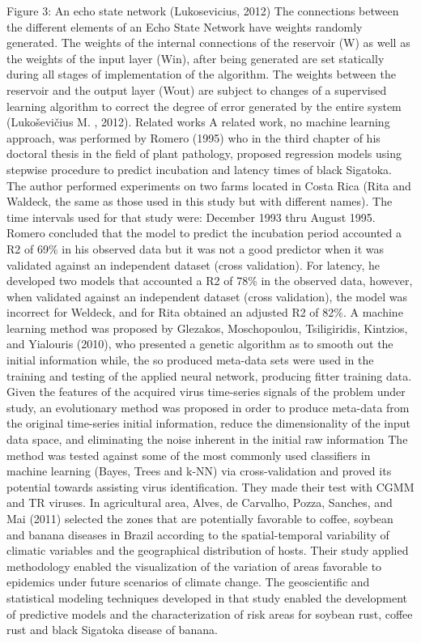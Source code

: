 \documentclass[review]{elsarticle}
\begin{document}
{{Figure 3: An echo state network (Lukosevicius, 2012)
The connections between the different elements of an Echo State Network have weights randomly generated. The weights of the internal connections of the reservoir (W) as well as the weights of the input layer (Win), after being generated are set statically during all stages of implementation of the algorithm. The weights between the reservoir and the output layer (Wout) are subject to changes of a supervised learning algorithm to correct the degree of error generated by the entire system (Lukoševičius M. , 2012).
Related works
A related work, no machine learning approach, was performed by Romero (1995) who in the third chapter of his doctoral thesis in the field of plant pathology, proposed regression models using stepwise procedure to predict incubation and latency times of black Sigatoka. The author performed experiments on two farms located in Costa Rica (Rita and Waldeck, the same as those used in this study but with different names). The time intervals used for that study were: December 1993 thru August 1995. Romero concluded that the model to predict the incubation period accounted a R2 of 69\% in his observed data but it was not a good predictor when it was validated against an independent dataset (cross validation). For latency, he developed two models that accounted a R2 of 78\% in the observed data, however, when validated against an independent dataset (cross validation), the model was incorrect for Weldeck, and for Rita obtained an adjusted R2 of 82\%. 
A machine learning method was proposed by Glezakos, Moschopoulou, Tsiligiridis, Kintzios, and Yialouris (2010), who presented a genetic algorithm as to smooth out the initial information while, the so produced meta-data sets were used in the training and testing of the applied neural network, producing fitter training data. Given the features of the acquired virus time-series signals of the problem under study, an evolutionary method was proposed in order to produce meta-data from the original time-series initial information, reduce the dimensionality of the input data space, and eliminating the noise inherent in the initial raw information The method was tested against some of the most commonly used classifiers in machine learning (Bayes, Trees and k-NN) via cross-validation and proved its potential towards assisting virus identification. They made their test with CGMM and TR viruses.
In agricultural area, Alves, de Carvalho, Pozza, Sanches, and Mai (2011) selected the zones that are potentially favorable to coffee, soybean and banana diseases in Brazil according to the spatial-temporal variability of climatic variables and the geographical distribution of hosts. Their study applied methodology enabled the visualization of the variation of areas favorable to epidemics under future scenarios of climate change. The geoscientific and statistical modeling techniques developed in that study enabled the development of predictive models and the characterization of risk areas for soybean rust, coffee rust and black Sigatoka disease of banana.
}}
\end{document}

